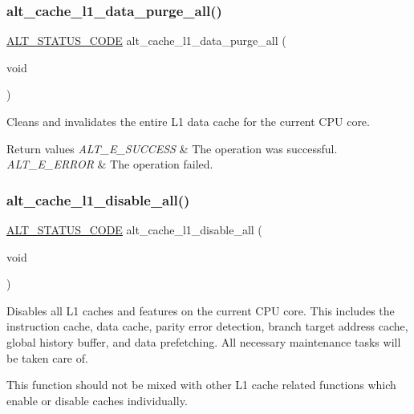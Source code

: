 \subsubsection{\texorpdfstring{alt\_cache\_l1\_data\_purge\_all()}{alt\_cache\_l1\_data\_purge\_all()}}
{\footnotesize\ttfamily \mbox{\hyperlink{hwlib_8h_abdb0d369f069723ca55d6c94bcaaaa12}{A\+L\+T\+\_\+\+S\+T\+A\+T\+U\+S\+\_\+\+C\+O\+DE}} alt\+\_\+cache\+\_\+l1\+\_\+data\+\_\+purge\+\_\+all (\begin{DoxyParamCaption}\item[{void}]{ }\end{DoxyParamCaption})}

Cleans and invalidates the entire L1 data cache for the current C\+PU core.


\begin{DoxyRetVals}{Return values}
{\em A\+L\+T\+\_\+\+E\+\_\+\+S\+U\+C\+C\+E\+SS} & The operation was successful. \\
\hline
{\em A\+L\+T\+\_\+\+E\+\_\+\+E\+R\+R\+OR} & The operation failed. \\
\hline
\end{DoxyRetVals}
\mbox{\label{group__CACHE__L1_ga11fb57c30d7d0db631d968f235da2683}} 
\subsubsection{\texorpdfstring{alt\_cache\_l1\_disable\_all()}{alt\_cache\_l1\_disable\_all()}}
{\footnotesize\ttfamily \mbox{\hyperlink{hwlib_8h_abdb0d369f069723ca55d6c94bcaaaa12}{A\+L\+T\+\_\+\+S\+T\+A\+T\+U\+S\+\_\+\+C\+O\+DE}} alt\+\_\+cache\+\_\+l1\+\_\+disable\+\_\+all (\begin{DoxyParamCaption}\item[{void}]{ }\end{DoxyParamCaption})}

Disables all L1 caches and features on the current C\+PU core. This includes the instruction cache, data cache, parity error detection, branch target address cache, global history buffer, and data prefetching. All necessary maintenance tasks will be taken care of.

This function should not be mixed with other L1 cache related functions which enable or disable caches individually.


